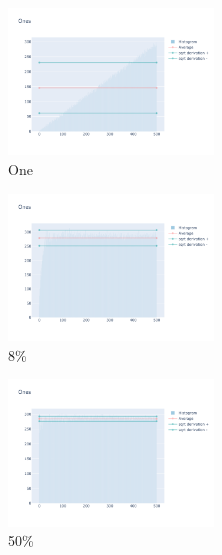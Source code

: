 \documentclass[12pt, fleqn]{report}                             %
\theoremstyle{break}                                            %
\begin{document}
      \begin{figure}[ht!]
        \centering
        \begin{subfigure}[b]{0.4\linewidth}
          \includegraphics[width=0.6\textwidth]{Images/110/dia-a.png}
          \caption{One}
        \end{subfigure}
        \begin{subfigure}[b]{0.4\linewidth}
          \includegraphics[width=0.6\textwidth]{Images/110/dia-b.png}
          \caption{8\%}
        \end{subfigure}
        \begin{subfigure}[b]{0.4\linewidth}
          \includegraphics[width=0.6\textwidth]{Images/110/dia-c.png}
          \caption{50\%}
        \end{subfigure}
        \begin{subfigure}[b]{0.4\linewidth}

\end{subfigure}
\end{figure}
\end{document}
